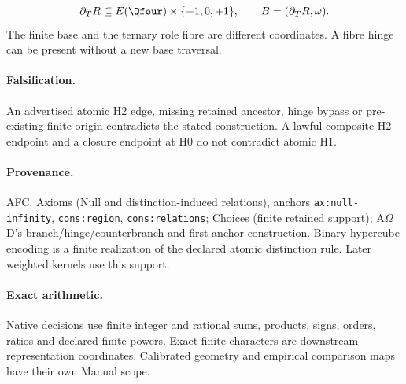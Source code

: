 \begin{equation}
\partial_T R\subseteq E(\Qfour)\times\{-1,0,+1\},
\qquad B=(\partial_T R,\omega).
\label{eq:tesseract-admissible-boundary}
\end{equation}
The finite base and the ternary role fibre are different coordinates. A fibre
hinge can be present without a new base traversal.

\paragraph{Falsification.}
An advertised atomic H2 edge, missing retained ancestor, hinge bypass or
pre-existing finite origin contradicts the stated construction. A lawful
composite H2 endpoint and a closure endpoint at H0 do not contradict atomic H1.

\paragraph{Provenance.}
AFC, Axioms (Null and distinction-induced relations), anchors \texttt{ax:null-infinity}, \texttt{cons:region}, \texttt{cons:relations}; Choices (finite
retained support); A\(\Omega\)D's branch/hinge/counterbranch and first-anchor
construction. Binary hypercube encoding is a finite realization of the declared
atomic distinction rule. Later weighted kernels use this support.

\paragraph{Exact arithmetic.}
\label{subsec:radical-free-arithmetic-policy}
Native decisions use finite integer and rational sums, products, signs,
orders, ratios and declared finite powers. Exact finite characters are
downstream representation coordinates. Calibrated geometry and empirical
comparison maps have their own Manual scope.
